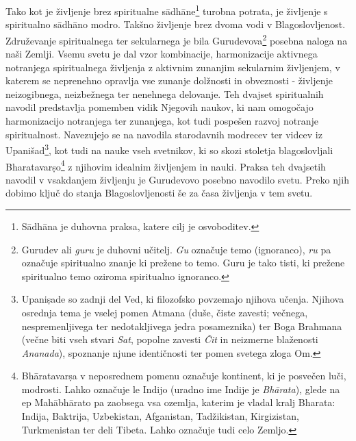 Tako kot je življenje brez spiritualne s\={a}dh\={a}ne\footnote{S\={a}dh\={a}na je duhovna praksa, katere cilj je osvoboditev.} turobna potrata, je življenje s spiritualno s\={a}dh\={a}no modro. Takšno življenje brez dvoma vodi v Blagoslovljenost.
Združevanje spiritualnega ter sekularnega je bila Gurudevova\footnote{Gurudev ali \emph{guru} je duhovni učitelj. \emph{Gu} označuje temo (ignoranco), \emph{ru} pa označuje spiritualno znanje ki prežene to temo. Guru je tako tisti, ki prežene spiritualno temo oziroma spiritualno ignoranco.} posebna naloga na naši Zemlji.
Vsemu svetu je dal vzor kombinacije, harmonizacije aktivnega notranjega spiritualnega življenja z aktivnim zunanjim sekularnim življenjem, v katerem se neprenehno opravlja vse zunanje dolžnosti in obveznosti - življenje neizogibnega, neizbežnega ter nenehnega delovanje. Teh dvajset spiritualnih navodil predstavlja pomemben vidik Njegovih naukov, ki nam omogočajo harmonizacijo notranjega ter zunanjega, kot tudi pospešen razvoj notranje spiritualnost. Navezujejo se na navodila starodavnih modrecev ter vidcev iz Upanišad\footnote{Upani\d{s}ade so zadnji del Ved, ki filozofsko povzemajo njihova učenja. Njihova osrednja tema je vselej pomen Atmana (duše, čiste zavesti; večnega, nespremenljivega ter nedotakljivega jedra posameznika) ter Boga Brahmana (večne biti vseh stvari \emph{Sat}, popolne zavesti \emph{Čit} in neizmerne blaženosti \emph{Ananada}), spoznanje njune identičnosti ter pomen svetega zloga Om.}, kot tudi na nauke vseh svetnikov, ki so skozi stoletja blagoslovljali Bharatavar\d{s}o\footnote{Bh\={a}ratavar\d{s}a v neposrednem pomenu označuje kontinent, ki je posvečen luči, modrosti. Lahko označuje le Indijo (uradno ime Indije je \emph{Bh\={a}rata}), glede na ep Mah\={a}bh\={a}rato pa zaobsega vsa ozemlja, katerim je vladal kralj Bharata: Indija, Baktrija, Uzbekistan, Afganistan, Tadžikistan,  Kirgizistan, Turkmenistan ter deli Tibeta. Lahko označuje tudi celo Zemljo.} z njihovim idealnim življenjem in nauki.
Praksa teh dvajsetih navodil v vsakdanjem življenju je Gurudevovo posebno navodilo svetu. Preko njih dobimo ključ do stanja Blagoslovljenosti še za časa življenja v tem svetu.
